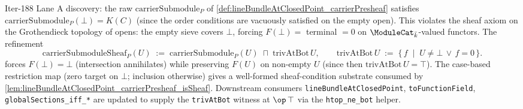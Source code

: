 \begin{definition}


\leanok
[Carrier-submodule refinement enforcing \(F(\bot)=0\)]
  \label{def:lineBundleAtClosedPoint_carrierSubmoduleSheaf}
  Iter-188 Lane A discovery: the raw \(\mathrm{carrierSubmodule}_P\) of
  \cref{def:lineBundleAtClosedPoint_carrierPresheaf} satisfies
  \(\mathrm{carrierSubmodule}_P(\bot) = K(C)\) (since the order conditions
  are vacuously satisfied on the empty open). This violates the sheaf
  axiom on the Grothendieck topology of opens: the empty sieve covers
  \(\bot\), forcing \(F(\bot) =\) terminal \(= 0\) on
  \(\ModuleCat_{\bar k}\)-valued functors.
  The refinement
  \[
    \mathrm{carrierSubmoduleSheaf}_P(U) \;:=\;
    \mathrm{carrierSubmodule}_P(U) \;\sqcap\; \mathrm{trivAtBot}\,U,
    \qquad \mathrm{trivAtBot}\,U \;:=\;
    \{\, f \;\mid\; U \ne \bot \,\lor\, f = 0 \,\}.
  \]
  forces \(F(\bot) = \bot\) (intersection annihilates) while preserving
  \(F(U)\) on non-empty \(U\) (since then \(\mathrm{trivAtBot}\,U = \top\)).
  The case-based restriction map (zero target on \(\bot\); inclusion
  otherwise) gives a well-formed sheaf-condition substrate consumed by
  \cref{lem:lineBundleAtClosedPoint_carrierPresheaf_isSheaf}. Downstream
  consumers \texttt{lineBundleAtClosedPoint}, \texttt{toFunctionField},
  \texttt{globalSections\_iff\_*} are updated to supply the
  \texttt{trivAtBot} witness at \(\op\,\top\) via the \texttt{htop\_ne\_bot}
  helper.
\end{definition}

